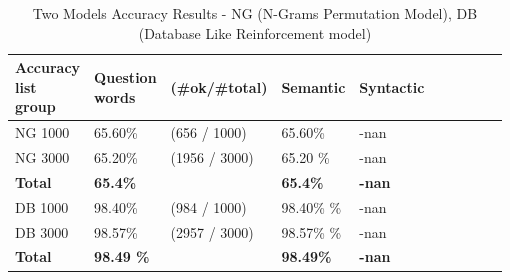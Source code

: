 \documentclass[letterpaper]{article}
\begin{document}
\begin{table}[ht]
\centering
\begin{tabular}{|p{0.14\linewidth}|p{0.14\linewidth}|p{0.14\linewidth}|p{0.14\linewidth}|p{0.14\linewidth}|p{0.14\linewidth}|p{0.14\linewidth}|}
\hline
\textbf{Accuracy list group}& \textbf{Question words}  & \textbf{(\#ok/\#total)}& \textbf{Semantic} & \textbf{Syntactic}\\
\hline
\hline
NG 1000 & 65.60\% & (656 / 1000) & 65.60\% & -nan\\
\hline
NG 3000 & 65.20\% & (1956 / 3000) & 65.20 \% & -nan\\
\hline
\textbf{Total}& \textbf{65.4\% }&  & \textbf{65.4\% }&  \textbf{-nan }\\
\hline
\hline
DB 1000 & 98.40\% & (984 / 1000) &98.40\% \% & -nan\\
\hline
DB 3000 & 98.57\% & (2957 / 3000) & 98.57\% \% & -nan\\
\hline
\textbf{Total}& \textbf{98.49 \% }&  & \textbf{98.49\% }&  \textbf{-nan}\\
\hline

\end{tabular}
\caption{Two Models Accuracy Results - NG (N-Grams Permutation Model), DB (Database Like Reinforcement model)}
\label{tab:two-models-accuracy-results}
\end{table}
\end{document}
